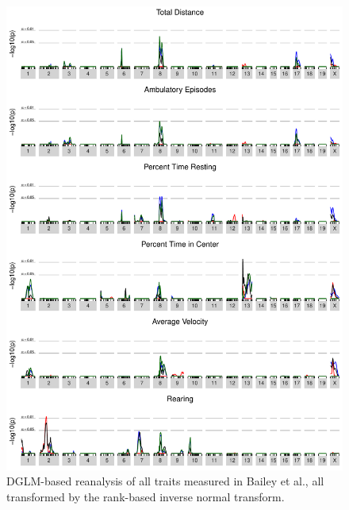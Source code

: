         \begin{figure}[h]
            \includegraphics[height=0.9\textheight]{images/bailey_scans_rint.pdf}
            \caption{DGLM-based reanalysis of all traits measured in Bailey et al., all transformed by the rank-based inverse normal transform.}
            \label{fig:Bailey_rint_scans}
        \end{figure}

